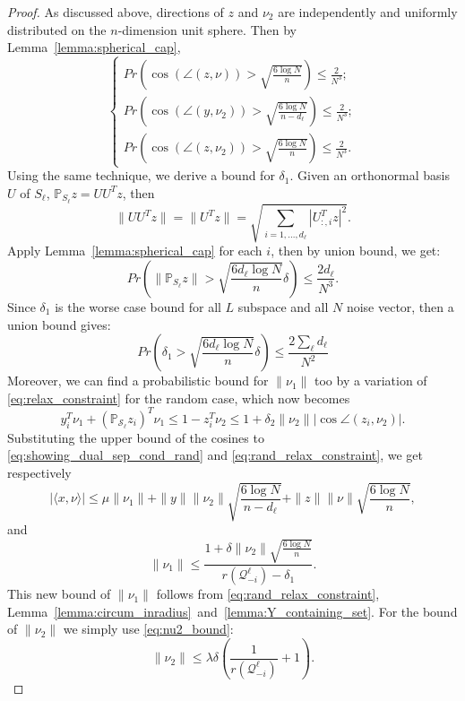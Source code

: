\documentclass[twoside,11pt]{article}
\numberwithin{equation}{section}
\begin{document}
\begin{proof}
  As discussed above, directions of $z$ and $\nu_2$ are independently and uniformly distributed on the $n$-dimension unit sphere. Then by Lemma~\ref{lemma:spherical_cap},
  $$\begin{cases}
    Pr\left(\cos(\angle(z,\nu)) > \sqrt{\frac{6\log N}{n}}\right) \leq \frac{2}{N^3};\\
    Pr\left(\cos(\angle(y,\nu_2)) > \sqrt{\frac{6\log N}{n-d_{\ell}}}\right) \leq \frac{2}{N^3};\\
    Pr\left(\cos(\angle(z,\nu_2)) > \sqrt{\frac{6\log N}{n}}\right) \leq \frac{2}{N^3}.
  \end{cases}$$
  Using the same technique, we derive a bound for $\delta_1$. Given an orthonormal basis $U$ of $S_{\ell}$, $\mathbb{P}_{S_{\ell}}z = UU^Tz$, then $$\|UU^Tz\|=\|U^Tz\| =\sqrt{ \sum_{i=1,...,d_{\ell}}|U_{:,i}^Tz|^2}.$$
    Apply Lemma~\ref{lemma:spherical_cap} for each $i$,
     then by union bound, we get:
  $$Pr\left(\|\mathbb{P}_{S_{\ell}}z\| > \sqrt{\frac{ 6d_{\ell}\log N}{n}}\delta\right) \leq \frac{2d_{\ell}}{N^3}.$$
  Since $\delta_1$ is the worse case bound for all $L$ subspace and all $N$ noise vector, then a union bound gives:
  $$Pr\left(\delta_1 > \sqrt{\frac{ 6d_{\ell}\log N}{n}}\delta\right) \leq \frac{2\sum_{\ell}d_{\ell}}{N^2}$$
  Moreover, we can find a probabilistic bound for $\|\nu_1\|$ too by a variation of \eqref{eq:relax_constraint} for the random case, which now becomes
\begin{equation}\label{eq:rand_relax_constraint}
  y_i^T\nu_1+(\mathbb{P}_{\mathcal{S}_{\ell}} z_i)^T\nu_1 \leq 1-z_i^T\nu_2\leq 1+\delta_2\|\nu_2\||\cos{\angle(z_i,\nu_2)}|.
\end{equation}
  Substituting the upper bound of the cosines to \eqref{eq:showing_dual_sep_cond_rand} and \eqref{eq:rand_relax_constraint}, we get respectively
  \begin{equation*}
    |\langle x, \nu \rangle| \leq \mu\|\nu_1\| + \|y\|\|\nu_2\|\sqrt{\frac{6\log N}{n-d_{\ell}}} + \|z\|\|\nu\|\sqrt{\frac{6\log N}{n}},
  \end{equation*}
and
$$
\|\nu_1\|\leq \frac{1+\delta\|\nu_2\|\sqrt{\frac{6\log N}{n}}}{r(\mathcal{Q}_{-i}^{\ell})-\delta_1}.
$$
This new bound of $\|\nu_1\|$ follows from \eqref{eq:rand_relax_constraint}, Lemma~\ref{lemma:circum_inradius}~and~\ref{lemma:Y_containing_set}. For the bound of $\|\nu_2\|$ we simply use \eqref{eq:nu2_bound}:
$$\|\nu_2\|\leq \lambda  \delta \left(\frac{1}{r(\mathcal{Q}_{-i}^{\ell})}+1\right).$$


\end{proof}
\end{document}
